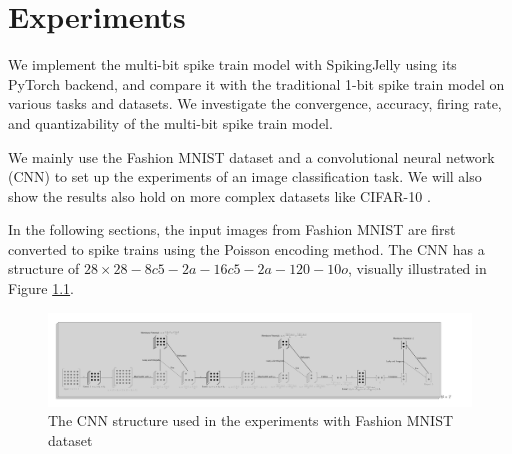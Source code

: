 \chapter{Experiments}
\label{chap:experiments}
We implement the multi-bit spike train model with SpikingJelly \cite{doi:10.1126/sciadv.adi1480} using its PyTorch backend, and compare it with the traditional 1-bit spike train model on various tasks and datasets. We investigate the convergence, accuracy, firing rate, and quantizability of the multi-bit spike train model. 

We mainly use the Fashion MNIST dataset \cite{xiao2017/online} and a convolutional neural network (CNN) to set up the experiments of an image classification task. We will also show the results also hold on more complex datasets like CIFAR-10 \cite{Krizhevsky2009}. 

In the following sections, the input images from Fashion MNIST are first converted to spike trains using the Poisson encoding method. The CNN has a structure of $28\times 28 - 8c5 - 2a - 16c5 - 2a - 120 - 10o$, visually illustrated in Figure \ref{fig:scnn_structure}. 

\begin{figure}[!htpb]
    \centering
    \includegraphics[width=\textwidth]{assets/standard/FashionMNIST/snn.pdf}
    \caption{The CNN structure used in the experiments with Fashion MNIST dataset}
    \label{fig:scnn_structure}
\end{figure}

